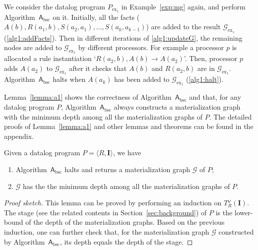 \begin{example}
We consider the datalog program $P_{\text{ex}_1}$ in Example~\ref{exp:mg} again,
and perform Algorithm~$\mathsf{A}_{\text{bsc}}$ on it.
Initially, all the facts ($A(b),R(a_1,b),S(a_2,a_1),\ldots,S(a_{k},a_{k-1})$) are added to the
result $\mathcal{G}_{\text{ex}_1}$ (\ref{alg1:addFacts}).
Then in different iterations of \ref{alg1:updateG}, the remaining nodes are added to
$\mathcal{G}_{\text{ex}_1}$ by different processors.
For example a processor $p$ is allocated a rule instantiation `$R(a_2,b),A(b)\rightarrow A(a_2)$'.
Then, processor $p$ adds $A(a_2)$ to $\mathcal{G}_{\text{ex}_1}$ after it checks that
$A(b)$ and $R(a_2,b)$ are in $\mathcal{G}_{\text{ex}_1}$.
Algorithm~$\mathsf{A}_{\text{bsc}}$ halts when $A(a_k)$ has been added to $\mathcal{G}_{\text{ex}_1}$ (\ref{alg1:halt}).
\end{example}

Lemma~\ref{lemma:a1} shows the correctness of Algorithm~$\mathsf{A}_{\text{bsc}}$ and that, for any datalog program $P$,
Algorithm~$\mathsf{A}_{\text{bsc}}$ always constructs a materialization graph with the minimum depth among all the
materialization graphs of $P$. The detailed proofs of Lemma~\ref{lemma:a1} and other lemmas and theorems can be found
in the appendix.

\begin{lemma}
\label{lemma:a1}
Given a datalog program $P=\langle R, \textbf{I}\rangle$, we have
\begin{enumerate}[leftmargin=4ex]
\item Algorithm~$\mathsf{A}_{\text{bsc}}$ halts and returns a materialization graph $\mathcal{G}$ of $P$;
\item $\mathcal{G}$ has the the minimum depth among all the materialization graphs of $P$.
\end{enumerate}
\end{lemma}

\begin{proof}[Proof sketch] This lemma can be proved by performing
an induction on $T_R^{\omega}(\textbf{I})$.
The stage (see the related contents in Section~\ref{sec:background}) of $P$
is the lower-bound of the depth of the materialization graphs. Based on the previous induction,
one can further check that, for the materialization graph $\mathcal{G}$ constructed by Algorithm~$\mathsf{A}_{\text{bsc}}$,
its depth equals the depth of the stage.
\end{proof}

